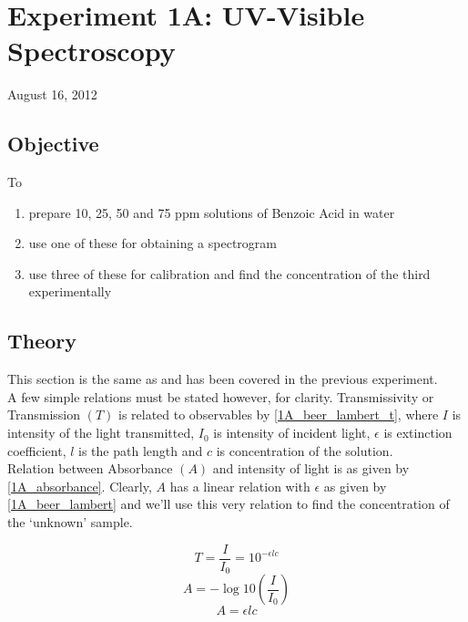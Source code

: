 \chapter{Experiment 1A: UV-Visible Spectroscopy}
\begin{flushright}
August 16, 2012
\end{flushright}

\section{Objective}
	To
	\begin{enumerate}
		\item prepare 10, 25, 50 and 75 ppm solutions of Benzoic Acid in water
		\item use one of these for obtaining a spectrogram
		\item use three of these for calibration and find the concentration of the third experimentally
	\end{enumerate}

\section{Theory}
	This section is the same as and has been covered in the previous experiment.\\
	A few simple relations must be stated however, for clarity. Transmissivity or Transmission $(T)$ is related to observables by \autoref{1A_beer_lambert_t}, where $I$ is intensity of the light transmitted, $I_{0}$ is intensity of incident light, $\epsilon$ is extinction coefficient, $l$ is the path length and $c$ is concentration of the solution.\\
	Relation between Absorbance $(A)$ and intensity of light is as given by \autoref{1A_absorbance}. Clearly, $A$ has a linear relation with $\epsilon$ as given by \autoref{1A_beer_lambert} and we'll use this very relation to find the concentration of the `unknown' sample.
	
	\begin{equation}
		T=\frac{I}{I_{0}}=10^{-\epsilon l c}
		\label{1A_beer_lambert_t}
	\end{equation}
	\begin{equation}
		A=-\log{10}(\frac{I}{I_{0}})
		\label{1A_absorbance}
	\end{equation}
	\begin{equation}
		A=\epsilon l c
		\label{1A_beer_lambert}
	\end{equation}
	

